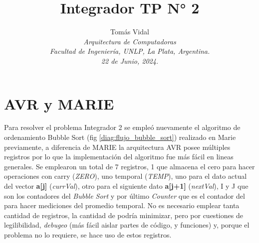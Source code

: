 \documentclass[letterpaper, 10 pt, conference]{ieeeconf}  %
\title{\LARGE \bf Integrador TP N° 2}
\author{
  Tom\'as Vidal\\
  {\it Arquitectura de Computadoras}\\
  {\it Facultad de Ingenier\'ia, UNLP, La Plata, Argentina.}\\
  {\it 22 de Junio, 2024.}
}                                            %
\begin{document}
\maketitle
\thispagestyle{empty}
\pagestyle{empty}

\section{AVR y MARIE}
Para resolver el problema Integrador 2 se empleó nuevamente el algoritmo de ordenamiento Bubble Sort (fig \ref{diag:flujo_bubble_sort}) realizado en Marie previamente, a diferencia de MARIE la arquitectura AVR posee múltiples registros por lo que la implementación del algoritmo fue más fácil en lineas generales. Se emplearon un total de 7 registros, 1 que almacena el cero para hacer operaciones con carry (\textit{ZERO}), uno temporal (\textit{TEMP}), uno para el dato actual del vector \textbf{a[j]} (\textit{currVal}), otro para el siguiente dato \textbf{a[j+1]} (\textit{nextVal}), I y J que son los contadores del \textit{Bubble Sort} y por último \textit{Counter} que es el contador del para hacer mediciones del promedio temporal. No es necesario emplear tanta cantidad de registros, la cantidad de podría minimizar, pero por cuestiones de legilibilidad, \textit{debugeo} (más fácil aislar partes de código, y funciones) y, porque el problema no lo requiere, se hace uso de estos registros. 
\end{document}
